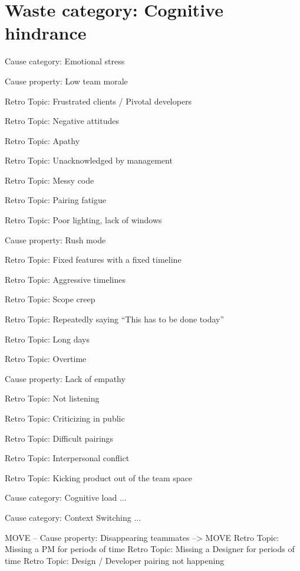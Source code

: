 \section{Waste category: Cognitive hindrance}

\quad Cause category: Emotional stress

\quad \quad Cause property: Low team morale

\quad \quad \quad Retro Topic: Frustrated clients / Pivotal developers

\quad \quad \quad Retro Topic: Negative attitudes

\quad \quad \quad Retro Topic: Apathy

\quad \quad \quad Retro Topic: Unacknowledged by management

\quad \quad \quad Retro Topic: Messy code

\quad \quad \quad Retro Topic: Pairing fatigue

\quad \quad \quad Retro Topic: Poor lighting, lack of windows

\quad \quad Cause property: Rush mode

\quad \quad \quad Retro Topic: Fixed features with a fixed timeline

\quad \quad \quad Retro Topic: Aggressive timelines

\quad \quad \quad Retro Topic: Scope creep

\quad \quad \quad Retro Topic: Repeatedly saying “This has to be done today”

\quad \quad \quad Retro Topic: Long days

\quad \quad \quad Retro Topic: Overtime

\quad \quad Cause property: Lack of empathy

\quad \quad \quad Retro Topic: Not listening

\quad \quad \quad Retro Topic: Criticizing in public

\quad \quad \quad Retro Topic: Difficult pairings

\quad \quad \quad Retro Topic: Interpersonal conflict

\quad \quad \quad Retro Topic: Kicking product out of the team space

\quad Cause category: Cognitive load ...

\quad Cause category: Context Switching ...

MOVE -- \quad \quad Cause property: Disappearing teammates --> MOVE
\quad \quad \quad Retro Topic: Missing a PM for periods of time
\quad \quad \quad Retro Topic: Missing a Designer for periods of time
\quad \quad \quad Retro Topic: Design / Developer pairing not happening




